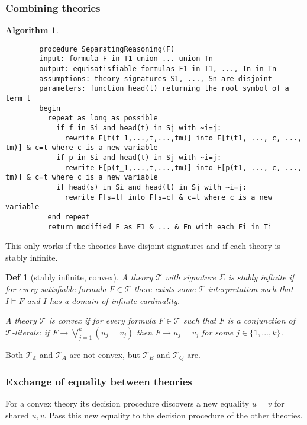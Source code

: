 \documentclass[]{article}
\newtheorem*{definition*}{Def}
\newtheorem{algorithm}{Algorithm}
\begin{document}
\subsubsection{Combining theories}
\begin{algorithm}
	\begin{verbatim}
		procedure SeparatingReasoning(F)
		input: formula F in T1 union ... union Tn
		output: equisatisfiable formulas F1 in T1, ..., Tn in Tn
		assumptions: theory signatures S1, ..., Sn are disjoint
		parameters: function head(t) returning the root symbol of a term t
		begin
		  repeat as long as possible
		    if f in Si and head(t) in Sj with ~i=j:
		      rewrite F[f(t_1,...,t,...,tm)] into F[f(t1, ..., c, ..., tm)] & c=t where c is a new variable
		    if p in Si and head(t) in Sj with ~i=j:
		      rewrite F[p(t_1,...,t,...,tm)] into F[p(t1, ..., c, ..., tm)] & c=t where c is a new variable
		    if head(s) in Si and head(t) in Sj with ~i=j:
		      rewrite F[s=t] into F[s=c] & c=t where c is a new variable
		  end repeat
		  return modified F as F1 & ... & Fn with each Fi in Ti
	\end{verbatim}
\end{algorithm}

This only works if the theories have disjoint signatures and if each theory is stably infinite.

\begin{definition*}[stably infinite, convex]
	A theory $\mathcal{T}$ with signature $\Sigma$ is stably infinite if for every satisfiable formula $F \in \mathcal{T}$ there exists some $\mathcal{T}$ interpretation such that $I\models F$ and $I$ has a domain of infinite cardinality.
	
	A theory $\mathcal{T}$ is convex if for every formula $F \in \mathcal{T}$ such that $F$ is a conjunction of $\mathcal{T}$-literals: if $F \rightarrow \bigvee_{j=1}^k(u_j=v_j)$ then $F\rightarrow u_j = v_j$ for some $j \in \{1,...,k\}$.
\end{definition*}

Both $\mathcal{T}_{\mathbb{Z}}$ and $\mathcal{T}_A$ are not convex, but $\mathcal{T}_E$ and $\mathcal{T}_Q$ are.

\subsubsection{Exchange of equality between theories}

For a convex theory its decision procedure discovers a new equality $u=v$ for shared $u,v$. Pass this new equality to the decision procedure of the other theories.
\end{document}

